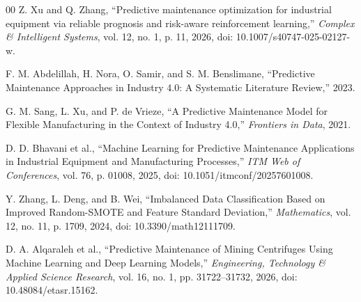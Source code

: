 \documentclass[conference]{IEEEtran}
\begin{document}
\begin{thebibliography}{00}
Z. Xu and Q. Zhang, ``Predictive maintenance optimization for industrial equipment via reliable prognosis and risk-aware reinforcement learning,'' \textit{Complex \& Intelligent Systems}, vol. 12, no. 1, p. 11, 2026, doi: 10.1007/s40747-025-02127-w.

F. M. Abdelillah, H. Nora, O. Samir, and S. M. Benslimane, ``Predictive Maintenance Approaches in Industry 4.0: A Systematic Literature Review,'' 2023.

G. M. Sang, L. Xu, and P. de Vrieze, ``A Predictive Maintenance Model for Flexible Manufacturing in the Context of Industry 4.0,'' \textit{Frontiers in Data}, 2021.

D. D. Bhavani et al., ``Machine Learning for Predictive Maintenance Applications in Industrial Equipment and Manufacturing Processes,'' \textit{ITM Web of Conferences}, vol. 76, p. 01008, 2025, doi: 10.1051/itmconf/20257601008.

Y. Zhang, L. Deng, and B. Wei, ``Imbalanced Data Classification Based on Improved Random-SMOTE and Feature Standard Deviation,'' \textit{Mathematics}, vol. 12, no. 11, p. 1709, 2024, doi: 10.3390/math12111709.

D. A. Alqaraleh et al., ``Predictive Maintenance of Mining Centrifuges Using Machine Learning and Deep Learning Models,'' \textit{Engineering, Technology \& Applied Science Research}, vol. 16, no. 1, pp. 31722--31732, 2026, doi: 10.48084/etasr.15162.

\end{thebibliography}
\end{document}

